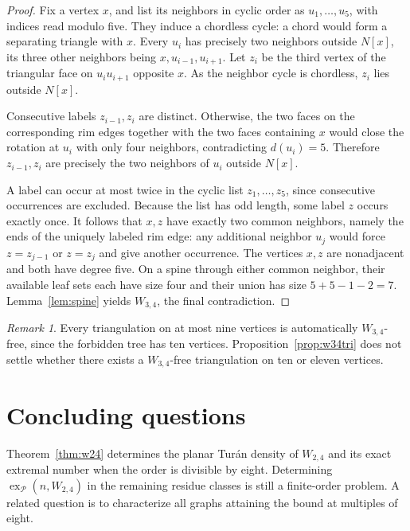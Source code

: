 \documentclass[11pt,a4paper]{article}
\theoremstyle{remark}
\newtheorem{remark}[theorem]{Remark}
\newcommand{\ex}{\operatorname{ex}}
\newcommand{\PP}{\mathcal P}
\begin{document}
\begin{proof}
Fix a vertex $x$, and list its neighbors in cyclic order as
$u_1,\ldots,u_5$, with indices read modulo five. They induce a
chordless cycle: a chord would form a separating triangle with
$x$. Every $u_i$ has precisely two neighbors outside $N[x]$,
its three other neighbors being $x,u_{i-1},u_{i+1}$. Let $z_i$
be the third vertex of the triangular face on $u_iu_{i+1}$
opposite $x$. As the neighbor cycle is chordless, $z_i$ lies
outside $N[x]$.

Consecutive labels $z_{i-1},z_i$ are distinct. Otherwise, the
two faces on the corresponding rim edges together with the two
faces containing $x$ would close the rotation at $u_i$ with only
four neighbors, contradicting $d(u_i)=5$. Therefore
$z_{i-1},z_i$ are precisely the two neighbors of $u_i$ outside
$N[x]$.

A label can occur at most twice in the cyclic list
$z_1,\ldots,z_5$, since consecutive occurrences are excluded.
Because the list has odd length, some label $z$ occurs exactly
once. It follows that $x,z$ have exactly two common neighbors,
namely the ends of the uniquely labeled rim edge: any additional
neighbor $u_j$ would force $z=z_{j-1}$ or $z=z_j$ and give another
occurrence. The vertices $x,z$ are nonadjacent and both have
degree five. On a spine through either common neighbor, their
available leaf sets each have size four and their union has size
$5+5-1-2=7$. Lemma~\ref{lem:spine} yields $W_{3,4}$, the final
contradiction.
\end{proof}

\begin{remark}
Every triangulation on at most nine vertices is automatically
$W_{3,4}$-free, since the forbidden tree has ten vertices.
Proposition~\ref{prop:w34tri} does not settle whether there exists
a $W_{3,4}$-free triangulation on ten or eleven vertices.
\end{remark}



\section{Concluding questions}

Theorem~\ref{thm:w24} determines the planar Tur\'an density of $W_{2,4}$ and its exact extremal number when the order is divisible by eight. Determining $\ex_{\PP}(n,W_{2,4})$ in the remaining residue classes is still a finite-order problem. A related question is to characterize all graphs attaining the bound at multiples of eight.
\end{document}
